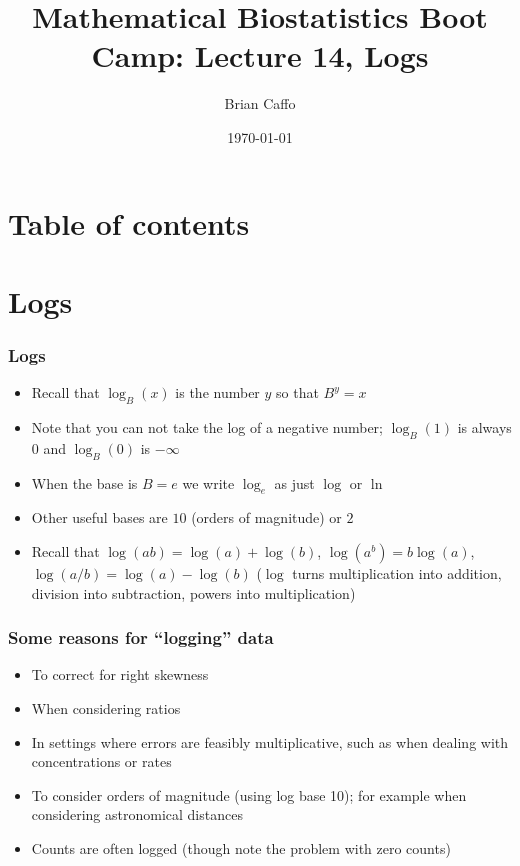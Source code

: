 \documentclass[aspectratio=169]{beamer}
\title{Mathematical Biostatistics Boot Camp: Lecture 14, Logs}
\author{Brian Caffo}
\date{\today}
\institute[Department of Biostatistics]{
  Department of Biostatistics \\
  Johns Hopkins Bloomberg School of Public Health\\
  Johns Hopkins University
}
\begin{document}
\frame{\titlepage}


\section{Table of contents}

\section{Logs}
\begin{frame}\frametitle{Logs}
\begin{itemize}
\item Recall that $\log_B(x)$ is the number
  $y$ so that $B^y = x$
\item Note that you can not take the log of a negative
  number; $\log_B(1)$ is always 0 and $\log_B(0)$ is $-\infty$
\item When the base is $B = e$  we
  write $\log_e$ as just $\log$ or $\ln$
\item Other useful bases are $10$ (orders of magnitude) or $2$
\item Recall that $\log(ab) = \log(a) + \log(b)$, $\log(a^b) = b\log(a)$,
  $\log(a/b) = \log(a) - \log(b)$ ($\log$ turns multiplication into addition,
  division into subtraction, powers into multiplication)
\end{itemize}
\end{frame}

\begin{frame}\frametitle{Some reasons for ``logging'' data}
\begin{itemize}
\item To correct for right skewness 
\item When considering ratios
\item In settings where errors are feasibly multiplicative, such as
  when dealing with concentrations or rates
\item To consider orders of magnitude (using log base 10); for example
  when considering astronomical distances
\item Counts are often logged (though note the problem with zero counts)
\end{itemize}
\end{frame}
\end{document}
